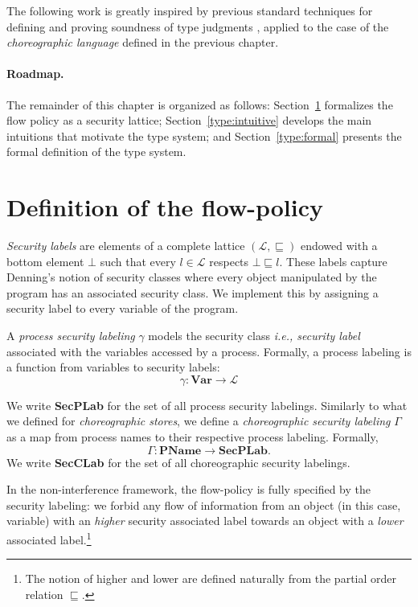 \documentclass[12pt,a4paper,twoside]{book}
\begin{document}
The following work is greatly inspired by previous standard techniques for defining and proving soundness of type judgments \cite{myers2011proving}\cite{wright1994syntactic}, applied to the case of the \emph{choreographic language} defined in the previous chapter.

\paragraph{Roadmap.}
The remainder of this chapter is organized as follows: Section~\ref{type:flow-policy} formalizes the flow policy as a security lattice; Section~\ref{type:intuitive} develops the main intuitions that motivate the type system; and Section~\ref{type:formal} presents the formal definition of the type system.

\section{Definition of the flow-policy}
\label{type:flow-policy}
\textit{Security labels} are elements of a complete lattice $(\mathscr{L}, \sqsubseteq)$ endowed with a bottom element $\bot$ such that every $l \in \mathscr{L}$ respects $\bot \sqsubseteq l$.
These labels capture Denning's notion of security classes where every object manipulated by the program has an associated security class. We implement this by assigning a security label to every variable of the program.

A \textit{process security labeling} $\gamma$ models the security class \textit{i.e., security label} associated with the variables accessed by a process. Formally, a process labeling is a function from variables to security labels:
\[
	\gamma : \textbf{Var} \longrightarrow \mathscr{L}
\]

We write \textbf{SecPLab} for the set of all process security labelings.
Similarly to what we defined for \textit{choreographic stores}, we define a \textit{choreographic security labeling} $\Gamma$ as a map from process names to their respective process labeling. Formally,
\[
\Gamma : \textbf{PName} \longrightarrow \textbf{SecPLab}.
\]
We write \textbf{SecCLab} for the set of all choreographic security labelings.

In the non-interference framework, the flow-policy is fully specified by the security labeling: we forbid any flow of information from an object (in this case, variable) with an \textit{higher} security associated label towards an object with a \textit{lower} associated label.\footnote{The notion of higher and lower are defined naturally from the partial order relation $\sqsubseteq$.}
\end{document}

